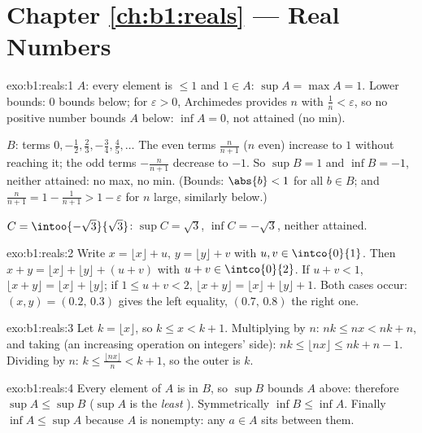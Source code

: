 \section*{Chapter \ref{ch:b1:reals} --- Real Numbers}

\begin{solution}{exo:b1:reals:1}
$A$: every element is $\leq 1$ and $1 \in A$: $\sup A = \max A = 1$.
Lower bounds: $0$ bounds below; for $\varepsilon > 0$, Archimedes
provides $n$ with $\frac 1n < \varepsilon$, so no positive number
bounds $A$ below: $\inf A = 0$, not attained (no min).

$B$: terms $0, -\frac12, \frac23, -\frac34, \frac45, \dots$ The even
terms $\frac{n}{n+1}$ ($n$ even) increase to $1$ without reaching it;
the odd terms $-\frac{n}{n+1}$ decrease to $-1$. So $\sup B = 1$ and
$\inf B = -1$, neither attained: no max, no min. (Bounds: $\abs{b}
< 1$ for all $b \in B$; and $\frac{n}{n+1} = 1 - \frac{1}{n+1} > 1 -
\varepsilon$ for $n$ large, similarly below.)

$C = \intoo{-\sqrt 3}{\sqrt 3}$: $\sup C = \sqrt 3$, $\inf C =
-\sqrt 3$, neither attained.
\end{solution}

\begin{solution}{exo:b1:reals:2}
Write $x = \lfloor x \rfloor + u$, $y = \lfloor y \rfloor + v$ with
$u, v \in \intco{0}{1}$. Then $x + y = \lfloor x \rfloor + \lfloor y
\rfloor + (u + v)$ with $u + v \in \intco{0}{2}$. If $u + v < 1$,
$\lfloor x + y\rfloor = \lfloor x\rfloor + \lfloor y \rfloor$; if
$1 \leq u + v < 2$, $\lfloor x+y \rfloor = \lfloor x \rfloor +
\lfloor y \rfloor + 1$. Both cases occur: $(x, y) = (0.2,\, 0.3)$
gives the left equality, $(0.7,\, 0.8)$ the right one.
\end{solution}

\begin{solution}{exo:b1:reals:3}
Let $k = \lfloor x \rfloor$, so $k \leq x < k + 1$. Multiplying by
$n$: $nk \leq nx < nk + n$, and taking  (an increasing
operation on integers' side): $nk \leq \lfloor nx \rfloor \leq nk + n
- 1$. Dividing by $n$: $k \leq \frac{\lfloor nx \rfloor}{n} < k + 1$,
so the outer  is $k$.
\end{solution}

\begin{solution}{exo:b1:reals:4}
Every element of $A$ is in $B$, so $\sup B$ bounds $A$ above:
therefore $\sup A \leq \sup B$ ($\sup A$ is the \emph{least} ). Symmetrically $\inf B \leq \inf A$. Finally $\inf A \leq
\sup A$ because $A$ is nonempty: any $a \in A$ sits between them.
\end{solution}

